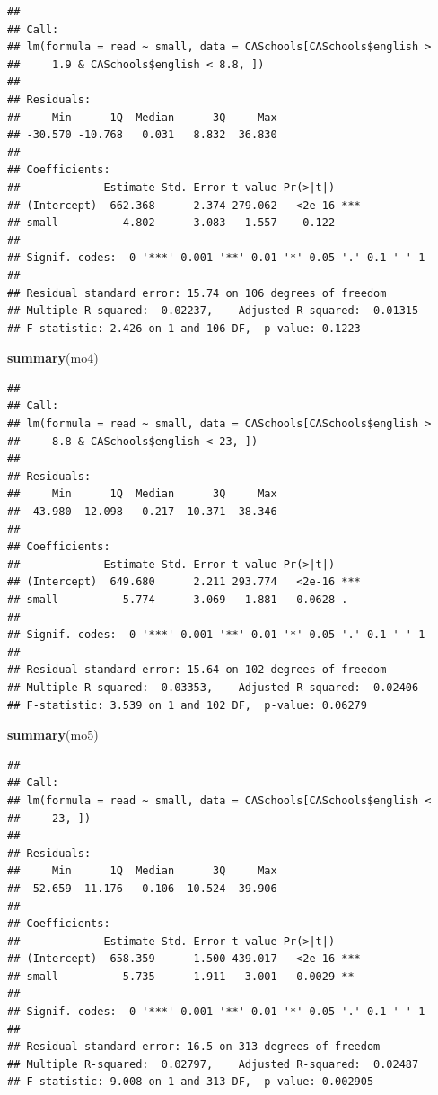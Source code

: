 \documentclass[
]{book}
\newenvironment{Shaded}{\begin{snugshade}}{\end{snugshade}}
\newcommand{\KeywordTok}[1]{\textcolor[rgb]{0.13,0.29,0.53}{\textbf{#1}}}
\newcommand{\NormalTok}[1]{#1}
\begin{document}
\begin{verbatim}
## 
## Call:
## lm(formula = read ~ small, data = CASchools[CASchools$english > 
##     1.9 & CASchools$english < 8.8, ])
## 
## Residuals:
##     Min      1Q  Median      3Q     Max 
## -30.570 -10.768   0.031   8.832  36.830 
## 
## Coefficients:
##             Estimate Std. Error t value Pr(>|t|)    
## (Intercept)  662.368      2.374 279.062   <2e-16 ***
## small          4.802      3.083   1.557    0.122    
## ---
## Signif. codes:  0 '***' 0.001 '**' 0.01 '*' 0.05 '.' 0.1 ' ' 1
## 
## Residual standard error: 15.74 on 106 degrees of freedom
## Multiple R-squared:  0.02237,    Adjusted R-squared:  0.01315 
## F-statistic: 2.426 on 1 and 106 DF,  p-value: 0.1223
\end{verbatim}

\begin{Shaded}
\begin{Highlighting}[]
\KeywordTok{summary}\NormalTok{(mo4)}
\end{Highlighting}
\end{Shaded}

\begin{verbatim}
## 
## Call:
## lm(formula = read ~ small, data = CASchools[CASchools$english > 
##     8.8 & CASchools$english < 23, ])
## 
## Residuals:
##     Min      1Q  Median      3Q     Max 
## -43.980 -12.098  -0.217  10.371  38.346 
## 
## Coefficients:
##             Estimate Std. Error t value Pr(>|t|)    
## (Intercept)  649.680      2.211 293.774   <2e-16 ***
## small          5.774      3.069   1.881   0.0628 .  
## ---
## Signif. codes:  0 '***' 0.001 '**' 0.01 '*' 0.05 '.' 0.1 ' ' 1
## 
## Residual standard error: 15.64 on 102 degrees of freedom
## Multiple R-squared:  0.03353,    Adjusted R-squared:  0.02406 
## F-statistic: 3.539 on 1 and 102 DF,  p-value: 0.06279
\end{verbatim}

\begin{Shaded}
\begin{Highlighting}[]
\KeywordTok{summary}\NormalTok{(mo5)}
\end{Highlighting}
\end{Shaded}

\begin{verbatim}
## 
## Call:
## lm(formula = read ~ small, data = CASchools[CASchools$english < 
##     23, ])
## 
## Residuals:
##     Min      1Q  Median      3Q     Max 
## -52.659 -11.176   0.106  10.524  39.906 
## 
## Coefficients:
##             Estimate Std. Error t value Pr(>|t|)    
## (Intercept)  658.359      1.500 439.017   <2e-16 ***
## small          5.735      1.911   3.001   0.0029 ** 
## ---
## Signif. codes:  0 '***' 0.001 '**' 0.01 '*' 0.05 '.' 0.1 ' ' 1
## 
## Residual standard error: 16.5 on 313 degrees of freedom
## Multiple R-squared:  0.02797,    Adjusted R-squared:  0.02487 
## F-statistic: 9.008 on 1 and 313 DF,  p-value: 0.002905
\end{verbatim}

\backmatter
  
\end{document}
